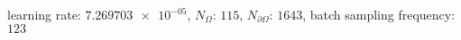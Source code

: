learning rate: $\num[scientific-notation=true]{7.269703e-05}$, $N_{\Omega}$: $\num[scientific-notation=false]{115}$, $N_{\partial\Omega}$: $\num[scientific-notation=false]{1643}$, batch sampling frequency: $\num[scientific-notation=false]{123}$